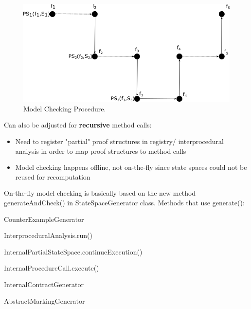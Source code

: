 \documentclass[a4paper,12pt]{article}
\newcommand{\cmark}{\ding{51}}%
\newcommand{\done}{\rlap{$\square$}{\raisebox{2pt}{\large\hspace{1pt}\cmark}}%
\hspace{-2.5pt}}
\begin{document}
\begin{figure}
	\includegraphics[width=\linewidth]{mc.png}
	\caption{Model Checking Procedure.}
	\label{fig:mc}
\end{figure}

Can also be adjusted for \textbf{recursive} method calls:

\begin{itemize}
	\item Need to register "partial" proof structures in registry/ interprocedural analysis in order to map proof structures to method calls	
	\item Model checking happens offline, not on-the-fly since state spaces could not be reused for recomputation
\end{itemize}

On-the-fly model checking is basically based on the new method generateAndCheck() in StateSpaceGenerator class. Methods that use generate():

\begin{todolist}
	\item CounterExampleGenerator
	\item[\done] InterproceduralAnalysis.run()
	\item[\done] InternalPartialStateSpace.continueExecution()
	\item[\done] InternalProcedureCall.execute()
	\item InternalContractGenerator
	\item AbstractMarkingGenerator
\end{todolist}
\end{document}
